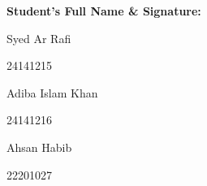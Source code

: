\vspace{1cm}
\textbf{Student's Full Name \& Signature:}

\newcommand*\idgap{\vspace{0.38cm}}
\begingroup

    \begin{center}
          {\centerline{Syed Ar Rafi}\idgap\centerline{24141215}}%
        \hspace{2.2cm}%
          {\centerline{Adiba Islam Khan}\idgap\centerline{24141216}}

          {\centerline{Ahsan Habib}\idgap\centerline{22201027}}
    \end{center}

\endgroup

\pagebreak
